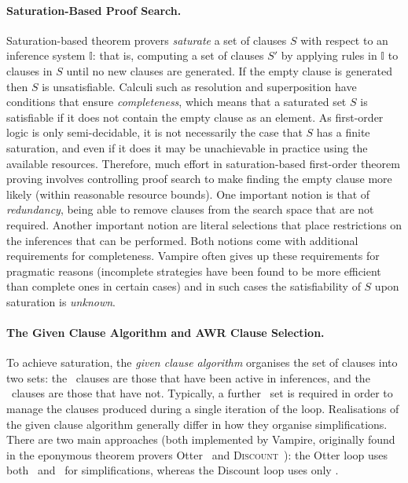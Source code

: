 \documentclass{llncs}
\begin{document}
\paragraph{Saturation-Based Proof Search.}
Saturation-based theorem provers \emph{saturate} a set of clauses $S$ with respect to an inference system $\mathbb{I}$: that is, computing a set of clauses $S'$ by applying rules in $\mathbb{I}$ to clauses in $S$ until no new clauses are generated. 
If the empty clause is generated then $S$ is unsatisfiable.
Calculi such as resolution and superposition have conditions that ensure \emph{completeness}, which means that a saturated set $S$ is satisfiable if it does not contain the empty clause as an element.
As first-order logic is only semi-decidable, it is not necessarily the case that $S$ has a finite saturation, and even if it does it may be unachievable in practice using the available resources. 
Therefore, much effort in saturation-based first-order theorem proving involves 
controlling proof search to make finding the empty clause more likely (within reasonable resource bounds). 
One important notion is that of \emph{redundancy}, being able to remove clauses from the search space that are not required. 
Another important notion are literal selections that place restrictions on the inferences that can be performed. 
Both notions come with additional requirements for completeness. Vampire often gives up these requirements for pragmatic reasons (incomplete strategies have been found to be more efficient than complete ones in certain cases) and in such cases the satisfiability of $S$ upon saturation is \emph{unknown}.

\paragraph{The Given Clause Algorithm and AWR Clause Selection.}
To achieve saturation, the \emph{given clause algorithm} organises the set of clauses into two sets: the \Active\ clauses are those that have been active in inferences, and the \Passive\ clauses are those that have not. Typically, a further \Unprocessed\ set is required in order to manage the clauses produced during a single iteration of the loop. 
Realisations of the given clause algorithm generally differ in how they organise simplifications. There are two main approaches (both implemented by Vampire, originally found in the eponymous theorem provers Otter~\cite{otter} and \textsc{Discount}~\cite{discount}): the Otter loop uses both \Active\ and \Passive\ for simplifications, whereas the Discount loop uses only \Active. 
\end{document}
